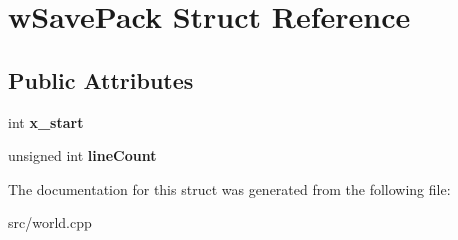\hypertarget{structwSavePack}{}\section{w\+Save\+Pack Struct Reference}
\label{structwSavePack}
\subsection*{Public Attributes}
\begin{DoxyCompactItemize}
\item 
\hypertarget{structwSavePack_ac8c1acad9ad6d6937e7bf7e04a395c47}{}int {\bfseries x\+\_\+start}\label{structwSavePack_ac8c1acad9ad6d6937e7bf7e04a395c47}

\item 
\hypertarget{structwSavePack_ac7f749ffe058ac5419f312f06bc23e67}{}unsigned int {\bfseries line\+Count}\label{structwSavePack_ac7f749ffe058ac5419f312f06bc23e67}

\end{DoxyCompactItemize}


The documentation for this struct was generated from the following file\+:\begin{DoxyCompactItemize}
\item 
src/world.\+cpp\end{DoxyCompactItemize}
